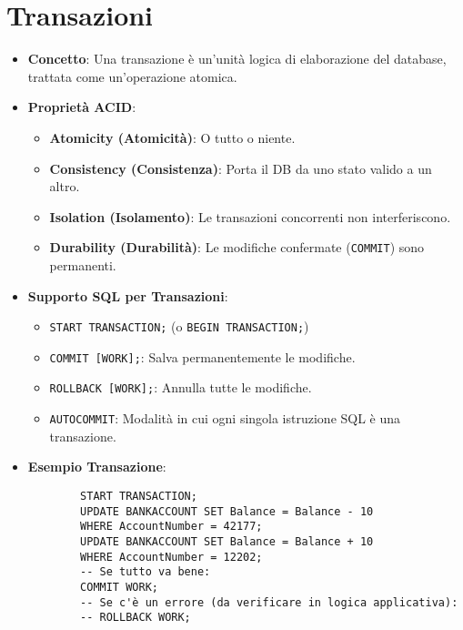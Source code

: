 \documentclass{article}
\begin{document}
	\section{Transazioni}
	\begin{itemize}
		\item \textbf{Concetto}: Una transazione è un'unità logica di elaborazione del database, trattata come un'operazione atomica.
		\item \textbf{Proprietà ACID}:
		\begin{itemize}
			\item \textbf{Atomicity (Atomicità)}: O tutto o niente.
			\item \textbf{Consistency (Consistenza)}: Porta il DB da uno stato valido a un altro.
			\item \textbf{Isolation (Isolamento)}: Le transazioni concorrenti non interferiscono.
			\item \textbf{Durability (Durabilità)}: Le modifiche confermate (\texttt{COMMIT}) sono permanenti.
		\end{itemize}
		\item \textbf{Supporto SQL per Transazioni}:
		\begin{itemize}
			\item \texttt{START TRANSACTION;} (o \texttt{BEGIN TRANSACTION;})
			\item \texttt{COMMIT [WORK];}: Salva permanentemente le modifiche.
			\item \texttt{ROLLBACK [WORK];}: Annulla tutte le modifiche.
			\item \texttt{AUTOCOMMIT}: Modalità in cui ogni singola istruzione SQL è una transazione.
		\end{itemize}
		\item \textbf{Esempio Transazione}:
		\begin{verbatim}
		START TRANSACTION;
		UPDATE BANKACCOUNT SET Balance = Balance - 10
		WHERE AccountNumber = 42177;
		UPDATE BANKACCOUNT SET Balance = Balance + 10
		WHERE AccountNumber = 12202;
		-- Se tutto va bene:
		COMMIT WORK;
		-- Se c'è un errore (da verificare in logica applicativa):
		-- ROLLBACK WORK;
		\end{verbatim}
	\end{itemize}
	
\end{document}
